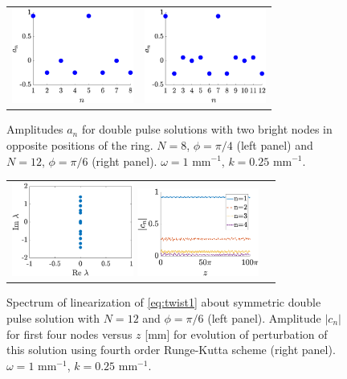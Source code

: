 \documentclass[reprint, amsmath,amssymb,aps,pra]{revtex4-2}
\begin{document}
\begin{figure}
\begin{center}
\begin{tabular}{cc}
\includegraphics[width=4cm]{dp8pi4} &
\includegraphics[width=4cm]{dp12pi6}
\end{tabular}
\end{center}
\caption{Amplitudes $a_n$ for double pulse solutions with two bright nodes in opposite positions of the ring. $N=8$, $\phi=\pi/4$ (left panel) and $N=12$, $\phi=\pi/6$ (right panel). $\omega = 1\text{ mm}^{-1}$, $k=0.25\text{ mm}^{-1}$.}
\label{fig:dp}
\end{figure}

\begin{figure}
\begin{center}
\begin{tabular}{cc}
\includegraphics[width=4cm]{dp12pi6spec.eps}
\includegraphics[width=4cm]{dp12pi6pert.eps}
\end{tabular}
\end{center}
\caption{Spectrum of linearization of \cref{eq:twist1} about symmetric double pulse solution with $N=12$ and $\phi = \pi/6$ (left panel). Amplitude $|c_n|$ for first four nodes versus $z$ [mm] for evolution of perturbation of this solution using fourth order Runge-Kutta scheme (right panel). $\omega = 1\text{ mm}^{-1}$, $k=0.25\text{ mm}^{-1}$.}
\label{fig:dpstab}
\end{figure}
\end{document}
